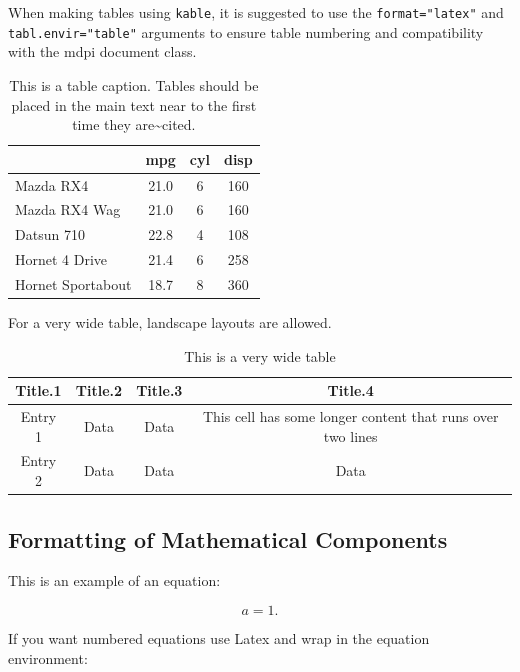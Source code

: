 \documentclass[notspecified,article,submit,moreauthors,pdftex]{Definitions/mdpi}
\begin{document}
When making tables using \texttt{kable}, it is suggested to use the
\texttt{format="latex"} and \texttt{tabl.envir="table"} arguments to
ensure table numbering and compatibility with the mdpi document class.

\begin{table}[H]

\caption{\label{tab:tab1}This is a table caption. Tables should be placed in the 
             main text near to the first time they are\textasciitilde{}cited.}
\begin{tabular}[t]{lccc}
\toprule
  & mpg & cyl & disp\\
\midrule
Mazda RX4 & 21.0 & 6 & 160\\
Mazda RX4 Wag & 21.0 & 6 & 160\\
Datsun 710 & 22.8 & 4 & 108\\
Hornet 4 Drive & 21.4 & 6 & 258\\
Hornet Sportabout & 18.7 & 8 & 360\\
\bottomrule
\end{tabular}
\end{table}

For a very wide table, landscape layouts are allowed.

\startlandscape

\begin{table}[H]

\caption{\label{tab:tab2}This is a very wide table}
\begin{tabular}[t]{cccc}
\toprule
Title.1 & Title.2 & Title.3 & Title.4\\
\midrule
Entry 1 & Data & Data & This cell has some longer content that runs over
                               two lines\\
Entry 2 & Data & Data & Data\\
\bottomrule
\end{tabular}
\end{table}

\finishlandscape

\subsection{Formatting of Mathematical
Components}\label{formatting-of-mathematical-components}

This is an example of an equation:

\[
a = 1.
\]

If you want numbered equations use Latex and wrap in the equation
environment:
\end{document}
